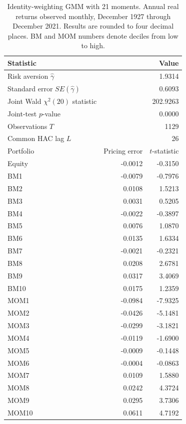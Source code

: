 \begin{table}[!htbp]
  \centering
  \small
  \caption{Identity-weighting GMM with 21 moments. Annual real returns
  observed monthly, December 1927 through December 2021. Results are rounded to four decimal places.
  BM and MOM numbers denote deciles from low to high.}
  \label{tab:q3e-gmm-results}
  \begin{tabular}{lrr}
    \toprule
    Statistic & \multicolumn{2}{r}{Value} \\
    \midrule
    Risk aversion $\hat\gamma$ & \multicolumn{2}{r}{1.9314} \\
    Standard error $SE(\hat\gamma)$ & \multicolumn{2}{r}{0.6093} \\
    Joint Wald $\chi^2(20)$ statistic & \multicolumn{2}{r}{202.9263} \\
    Joint-test $p$-value & \multicolumn{2}{r}{0.0000} \\
    Observations $T$ & \multicolumn{2}{r}{1129} \\
    Common HAC lag $L$ & \multicolumn{2}{r}{26} \\
    \midrule
    Portfolio & Pricing error & $t$-statistic \\
    \midrule
    Equity & -0.0012 & -0.3150 \\
    \addlinespace
    BM1 & -0.0079 & -0.7976 \\
    BM2 & 0.0108 & 1.5213 \\
    BM3 & 0.0031 & 0.5205 \\
    BM4 & -0.0022 & -0.3897 \\
    BM5 & 0.0076 & 1.0870 \\
    BM6 & 0.0135 & 1.6334 \\
    BM7 & -0.0021 & -0.2321 \\
    BM8 & 0.0208 & 2.6781 \\
    BM9 & 0.0317 & 3.4069 \\
    BM10 & 0.0175 & 1.2359 \\
    \addlinespace
    MOM1 & -0.0984 & -7.9325 \\
    MOM2 & -0.0426 & -5.1481 \\
    MOM3 & -0.0299 & -3.1821 \\
    MOM4 & -0.0119 & -1.6900 \\
    MOM5 & -0.0009 & -0.1448 \\
    MOM6 & -0.0004 & -0.0863 \\
    MOM7 & 0.0109 & 1.5880 \\
    MOM8 & 0.0242 & 4.3724 \\
    MOM9 & 0.0295 & 3.7306 \\
    MOM10 & 0.0611 & 4.7192 \\
    \bottomrule
  \end{tabular}
\end{table}
